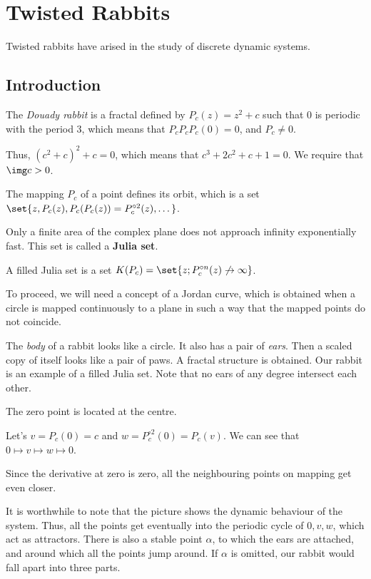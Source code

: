 \documentclass[11pt]{scrartcl}
\begin{document}
  \section{Twisted Rabbits}

  Twisted rabbits have arised in the study of discrete dynamic systems.

  \subsection{Introduction}
  \begin{definition}
    The \textit{Douady rabbit} is a fractal defined by
    $P_{c}(z) = z^{2} + c$ such that 0 is periodic with the period 3,
    which means that $P_{c}P_{c}P_{c}(0) = 0$, and $P_{c} \neq 0$.

    Thus, $(c^{2} + c)^{2} + c = 0$, which means that
    $c^{3} + 2 c^{2} + c + 1 = 0$. We require that $\img c > 0$.
  \end{definition}

  The mapping $P_{c}$ of a point defines its orbit, which is a set
  $\set{z, P_{c}(z), P_{c}(P_{c}(z)) = P^{\circ 2}_{c}(z), \dots}$.

  Only a finite area of the complex plane does not approach infinity
  exponentially fast. This set is called a \textbf{Julia set}.

  \begin{definition}
    A filled Julia set is a set
    $K(P_{c}) = \set{z; P_{c}^{\circ n}(z)\not \to \infty}$.
  \end{definition}

  To proceed, we will need a concept of a Jordan curve, which is
  obtained when a circle is mapped continuously to a plane in such a
  way that the mapped points do not coincide.

  The \textit{body} of a rabbit looks like a circle. It also has a
  pair of \textit{ears}. Then a scaled copy of itself looks like a
  pair of paws. A fractal structure is obtained. Our rabbit is an
  example of a filled Julia set. Note that no ears of any degree
  intersect each other.

  The zero point is located at the centre.

  Let's $v = P_{c}(0) = c$ and $w = P^{\circ 2}_{c}(0) = P_{c}(v)$. We
  can see that $0\mapsto v \mapsto w \mapsto 0$.

  Since the derivative at zero is zero, all the neighbouring points
  on mapping get even closer.

  It is worthwhile to note that the picture shows the dynamic
  behaviour of the system. Thus, all the points get eventually into
  the periodic cycle of $0, v, w$, which act as attractors. There is
  also a stable point $\alpha$, to which the ears are attached, and
  around which all the points jump around. If $\alpha$ is omitted, our
  rabbit would fall apart into three parts.
\end{document}

